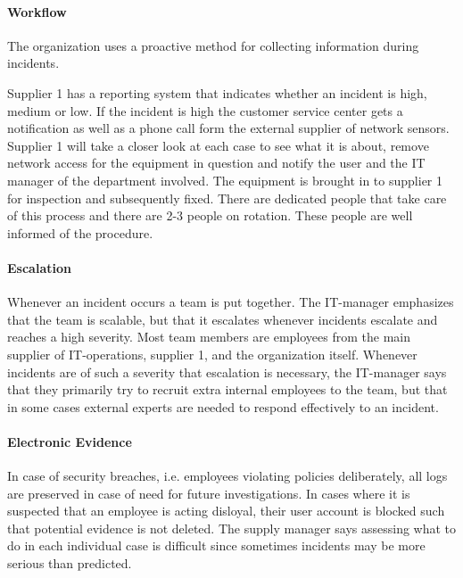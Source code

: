 \paragraph{Workflow}
The organization uses a proactive method for collecting information during incidents. %


Supplier 1 has a reporting system that indicates whether an incident is high, medium or low. If the incident is high the customer service center gets a notification as well as a phone call form the external supplier of network sensors. Supplier 1 will take a closer look at each case to see what it is about, remove network access for the equipment in question and notify the user and the IT manager of the department involved. The equipment is brought in to supplier 1 for inspection and subsequently fixed. There are dedicated people that take care of this process and there are 2-3 people on rotation. These people are well informed of the procedure.  

\paragraph{Escalation}
Whenever an incident occurs a team is put together. The IT-manager emphasizes that the team is scalable, but that it escalates whenever incidents escalate and reaches a high severity. Most team members are employees from the main supplier of IT-operations, supplier 1, and the organization itself. Whenever incidents are of such a severity that escalation is necessary, the IT-manager says that they primarily try to recruit extra internal employees to the team, but that in some cases external experts are needed to respond effectively to an incident.

\paragraph{Electronic Evidence}
In case of security breaches, i.e. employees violating policies deliberately, all logs are preserved in case of need for future investigations. In cases where it is suspected that an employee is acting disloyal, their user account is blocked such that potential evidence is not deleted. The supply manager says assessing what to do in each individual case is difficult since sometimes incidents may be more serious than predicted. 

